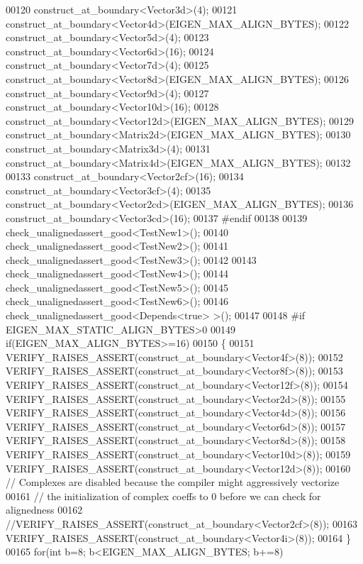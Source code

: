 \begin{DoxyCode}
00120   construct\_at\_boundary<Vector3d>(4);
00121   construct\_at\_boundary<Vector4d>(EIGEN\_MAX\_ALIGN\_BYTES);
00122   construct\_at\_boundary<Vector5d>(4);
00123   construct\_at\_boundary<Vector6d>(16);
00124   construct\_at\_boundary<Vector7d>(4);
00125   construct\_at\_boundary<Vector8d>(EIGEN\_MAX\_ALIGN\_BYTES);
00126   construct\_at\_boundary<Vector9d>(4);
00127   construct\_at\_boundary<Vector10d>(16);
00128   construct\_at\_boundary<Vector12d>(EIGEN\_MAX\_ALIGN\_BYTES);
00129   construct\_at\_boundary<Matrix2d>(EIGEN\_MAX\_ALIGN\_BYTES);
00130   construct\_at\_boundary<Matrix3d>(4);
00131   construct\_at\_boundary<Matrix4d>(EIGEN\_MAX\_ALIGN\_BYTES);
00132 
00133   construct\_at\_boundary<Vector2cf>(16);
00134   construct\_at\_boundary<Vector3cf>(4);
00135   construct\_at\_boundary<Vector2cd>(EIGEN\_MAX\_ALIGN\_BYTES);
00136   construct\_at\_boundary<Vector3cd>(16);
00137 \textcolor{preprocessor}{#endif}
00138 
00139   check\_unalignedassert\_good<TestNew1>();
00140   check\_unalignedassert\_good<TestNew2>();
00141   check\_unalignedassert\_good<TestNew3>();
00142 
00143   check\_unalignedassert\_good<TestNew4>();
00144   check\_unalignedassert\_good<TestNew5>();
00145   check\_unalignedassert\_good<TestNew6>();
00146   check\_unalignedassert\_good<Depends<true> >();
00147 
00148 \textcolor{preprocessor}{#if EIGEN\_MAX\_STATIC\_ALIGN\_BYTES>0}
00149   \textcolor{keywordflow}{if}(EIGEN\_MAX\_ALIGN\_BYTES>=16)
00150   \{
00151     VERIFY\_RAISES\_ASSERT(construct\_at\_boundary<Vector4f>(8));
00152     VERIFY\_RAISES\_ASSERT(construct\_at\_boundary<Vector8f>(8));
00153     VERIFY\_RAISES\_ASSERT(construct\_at\_boundary<Vector12f>(8));
00154     VERIFY\_RAISES\_ASSERT(construct\_at\_boundary<Vector2d>(8));
00155     VERIFY\_RAISES\_ASSERT(construct\_at\_boundary<Vector4d>(8));
00156     VERIFY\_RAISES\_ASSERT(construct\_at\_boundary<Vector6d>(8));
00157     VERIFY\_RAISES\_ASSERT(construct\_at\_boundary<Vector8d>(8));
00158     VERIFY\_RAISES\_ASSERT(construct\_at\_boundary<Vector10d>(8));
00159     VERIFY\_RAISES\_ASSERT(construct\_at\_boundary<Vector12d>(8));
00160     \textcolor{comment}{// Complexes are disabled because the compiler might aggressively vectorize}
00161     \textcolor{comment}{// the initialization of complex coeffs to 0 before we can check for alignedness}
00162     \textcolor{comment}{//VERIFY\_RAISES\_ASSERT(construct\_at\_boundary<Vector2cf>(8));}
00163     VERIFY\_RAISES\_ASSERT(construct\_at\_boundary<Vector4i>(8));
00164   \}
00165   \textcolor{keywordflow}{for}(\textcolor{keywordtype}{int} b=8; b<EIGEN\_MAX\_ALIGN\_BYTES; b+=8)

\end{DoxyCode}
